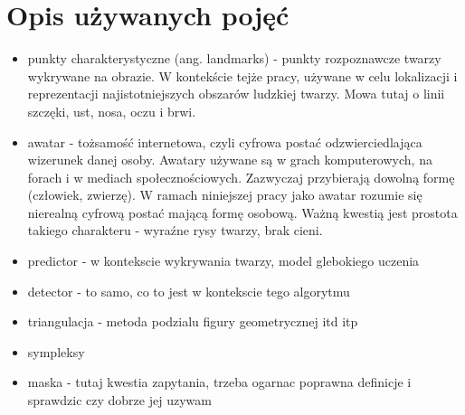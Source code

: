 \chapter{Opis używanych pojęć}
\label{}
\begin{itemize}
    \item punkty charakterystyczne (ang. landmarks) - punkty rozpoznawcze twarzy wykrywane na obrazie. W kontekście tejże pracy, używane w celu lokalizacji i reprezentacji najistotniejszych obszarów ludzkiej twarzy. Mowa tutaj o linii szczęki, ust, nosa, oczu i brwi.
    \item awatar - tożsamość internetowa, czyli cyfrowa postać odzwierciedlająca wizerunek danej osoby. Awatary używane są w grach komputerowych, na forach i w mediach społecznościowych. Zazwyczaj przybierają dowolną formę (człowiek, zwierzę). W ramach niniejszej pracy jako awatar rozumie się nierealną cyfrową postać mającą formę osobową. Ważną kwestią jest prostota takiego charakteru - wyraźne rysy twarzy, brak cieni.
    \item predictor - w kontekscie wykrywania twarzy, model glebokiego uczenia
    \item detector - to samo, co to jest w kontekscie tego algorytmu
    \item triangulacja - metoda podzialu figury geometrycznej itd itp
    \item sympleksy
    \item maska - tutaj kwestia zapytania, trzeba ogarnac poprawna definicje i sprawdzic czy dobrze jej uzywam
\end{itemize}